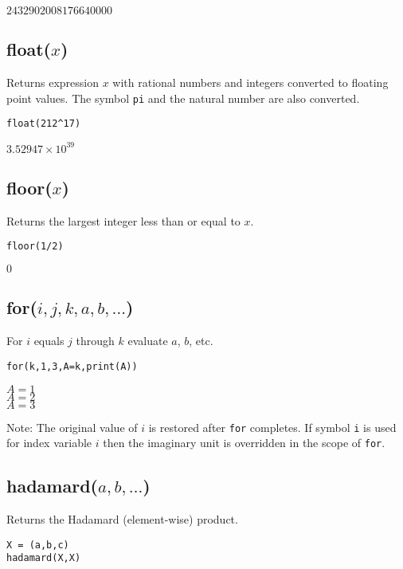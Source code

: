 \noindent
$2432902008176640000$

\subsection*{float($x$)}

Returns expression $x$ with rational numbers and integers converted to
floating point values.
The symbol {\tt pi} and the natural number are also converted.

{\color{blue}
\begin{verbatim}
float(212^17)
\end{verbatim}
}

\noindent
$\displaystyle 3.52947\times 10^{39}$

\subsection*{floor($x$)}

Returns the largest integer less than or equal to $x$.

{\color{blue}
\begin{verbatim}
floor(1/2)
\end{verbatim}
}

\noindent
$0$

\subsection*{for($i,j,k,a,b,\ldots$)}

For $i$ equals $j$ through $k$ evaluate $a$, $b$, etc.

{\color{blue}
\begin{verbatim}
for(k,1,3,A=k,print(A))
\end{verbatim}
}

\noindent
$A=1$\\
$A=2$\\
$A=3$

\bigskip
\noindent
Note: The original value of $i$ is restored after {\tt for} completes.
If symbol {\tt i} is used for index variable $i$
then the imaginary unit is overridden in the scope of {\tt for}.

\subsection*{hadamard($a,b,\ldots$)}

Returns the Hadamard (element-wise) product.

{\color{blue}
\begin{verbatim}
X = (a,b,c)
hadamard(X,X)
\end{verbatim}
}

